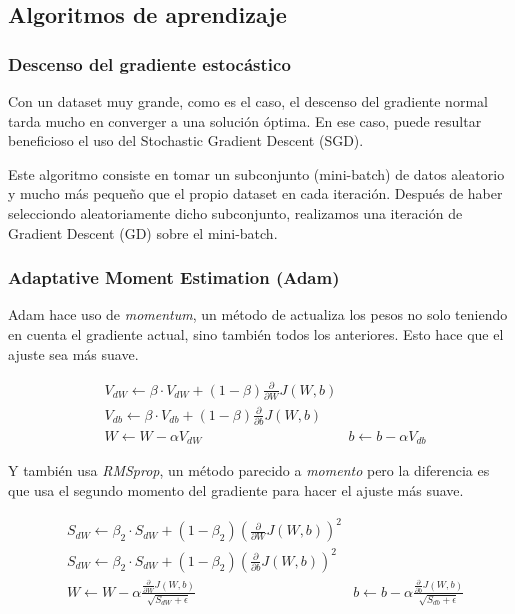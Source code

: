 \subsection{Algoritmos de aprendizaje}

\subsubsection{Descenso del gradiente estocástico}

Con un dataset muy grande, como es el caso, el descenso del gradiente normal tarda mucho en converger a una solución óptima. En ese caso, puede resultar beneficioso el uso del Stochastic Gradient Descent (SGD).\newline

Este algoritmo consiste en tomar un subconjunto (mini-batch) de datos aleatorio y mucho más pequeño que el propio dataset en cada iteración. Después de haber selecciondo aleatoriamente dicho subconjunto, realizamos una iteración de Gradient Descent (GD) sobre el mini-batch.

\subsubsection{Adaptative Moment Estimation (Adam)}

Adam hace uso de \textit{momentum}, un método de actualiza los pesos no solo teniendo en cuenta el gradiente actual, sino también todos los anteriores. Esto hace que el ajuste sea más suave.

\begin{align}
	&V_{dW} \leftarrow \beta \cdot V_{dW} + (1 - \beta) \frac{\partial}{\partial W} J(W,b)\\
	&V_{db} \leftarrow \beta \cdot V_{db} + (1 - \beta) \frac{\partial}{\partial b} J(W,b)\\
	&W \leftarrow W - \alpha V_{dW}
	&b \leftarrow b - \alpha V_{db}
\end{align}

Y también usa \textit{RMSprop}, un método parecido a \textit{momento} pero la diferencia es que usa el segundo momento del gradiente para hacer el ajuste más suave.

\begin{align}
	&S_{dW} \leftarrow \beta_2 \cdot S_{dW} + (1 - \beta_2) \left( \frac{\partial}{\partial W} J(W,b) \right)^2\\
	&S_{dW} \leftarrow \beta_2 \cdot S_{dW} + (1 - \beta_2) \left( \frac{\partial}{\partial b} J(W,b) \right)^2\\
	&W \leftarrow W - \alpha \frac{\frac{\partial}{\partial W} J(W,b)}{\sqrt{S_{dW} + \epsilon}}
	&b \leftarrow b - \alpha \frac{\frac{\partial}{\partial b} J(W,b)}{\sqrt{S_{db} + \epsilon}}
\end{align}

